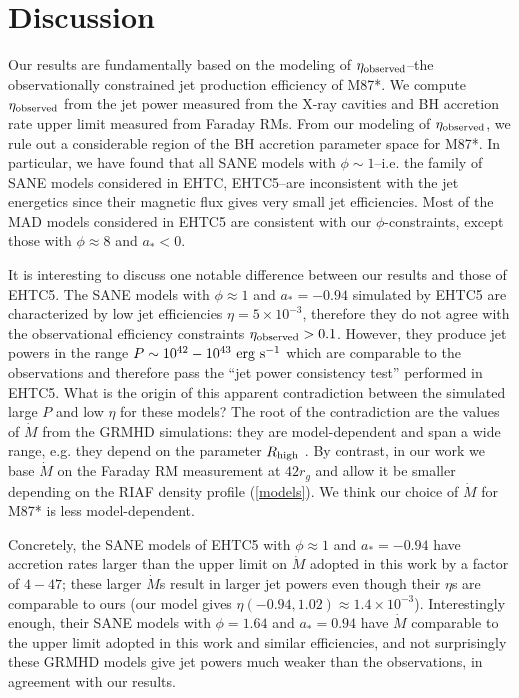 \documentclass[twocolumn, linenumbers]{aastex62} %
\begin{document}
\section{Discussion} \label{sec:disc}

Our results are fundamentally based on the modeling of $\eta_{\rm observed}$--the observationally constrained jet production efficiency of M87*. We compute $\eta_{\rm observed}$ from the jet power measured from the X-ray cavities and BH accretion rate upper limit measured from Faraday RMs. From our modeling of $\eta_{\rm observed}$, we rule out a considerable region of the BH accretion parameter space for M87*. In particular, we have found that all SANE models with $\phi \sim 1$--i.e. the family of SANE models considered in EHTC, EHTC5--are inconsistent with the jet energetics since their magnetic flux gives very small jet efficiencies. Most of the MAD models considered in EHTC5 are consistent with our $\phi$-constraints, except those with $\phi \approx 8$ and $a_*<0$.

It is interesting to discuss one notable difference between our results and those of EHTC5. The SANE models with $\phi \approx 1$ and $a_*=-0.94$ simulated by EHTC5 are characterized by low jet efficiencies $\eta = 5 \times 10^{-3}$, therefore they do not agree with the observational efficiency constraints $\eta_{\rm observed} > 0.1$. However, they produce jet powers in the range $P \sim 10^{42}-10^{43} \ {\rm erg \ s}^{-1}$ which are comparable to the observations and therefore pass the ``jet power consistency test'' performed in EHTC5. What is the origin of this apparent contradiction between the simulated large $P$ and low $\eta$ for these models? 
The root of the contradiction are the values of $\dot{M}$ from the GRMHD simulations: they are model-dependent and span a wide range, e.g. they depend on the parameter $R_{\rm high}$ \citep{Moscibrodzka2016}. By contrast, in our work we base $\dot{M}$ on the Faraday RM measurement at $42 r_g$ \citep{Kuo2014} and allow it be smaller depending on the RIAF density profile (\textsection \ref{models}). We think our choice of $\dot{M}$ for M87* is less model-dependent. 

Concretely, the SANE models of EHTC5 with $\phi \approx 1$ and $a_*=-0.94$ have accretion rates larger than the upper limit on $\dot{M}$ adopted in this work by a factor of $4-47$; these larger $\dot{M}$s result in larger jet powers even though their $\eta$s are comparable to ours (our model gives $\eta(-0.94, 1.02) \approx  1.4 \times 10^{-3}$). Interestingly enough, their SANE models with $\phi = 1.64$ and $a_*=0.94$ have $\dot{M}$ comparable to the upper limit adopted in this work and similar efficiencies, and not surprisingly these GRMHD models give jet powers much weaker than the observations, in agreement with our results.
\end{document}
